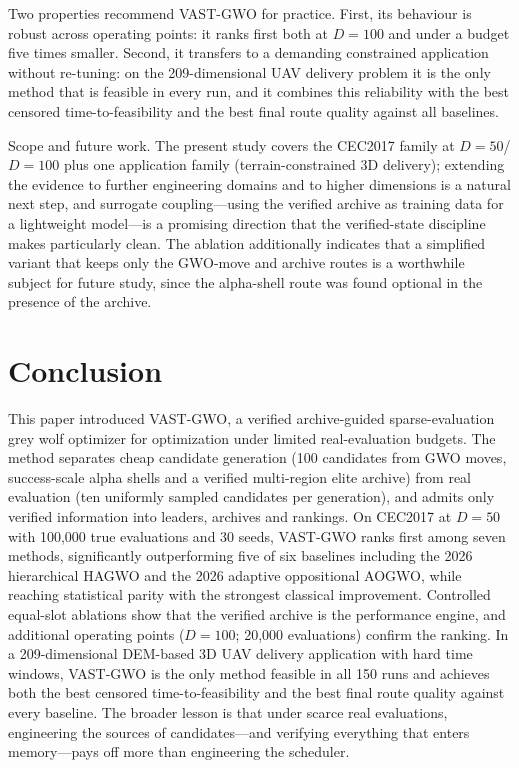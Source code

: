 \documentclass[journal]{IEEEtran}
\newcommand{\method}{VAST-GWO}
\begin{document}
Two properties recommend \method{} for practice. First, its behaviour is
robust across operating points: it ranks first both at $D=100$ and under a
budget five times smaller. Second, it transfers to a demanding constrained
application without re-tuning: on the 209-dimensional UAV delivery problem
it is the only method that is feasible in every run, and it combines this
reliability with the best censored time-to-feasibility and the best final
route quality against all baselines.

Scope and future work. The present study covers the CEC2017 family at
$D=50$/$D=100$ plus one application family (terrain-constrained 3D
delivery); extending the evidence to further engineering domains and to
higher dimensions is a natural next step, and surrogate coupling---using the
verified archive as training data for a lightweight model---is a promising
direction that the verified-state discipline makes particularly clean. The
ablation additionally indicates that a simplified variant that keeps only
the GWO-move and archive routes is a worthwhile subject for future study,
since the alpha-shell route was found optional in the presence of the
archive.

\section{Conclusion}
This paper introduced \method{}, a verified archive-guided sparse-evaluation
grey wolf optimizer for optimization under limited real-evaluation budgets.
The method separates cheap candidate generation (100 candidates from GWO
moves, success-scale alpha shells and a verified multi-region elite archive)
from real evaluation (ten uniformly sampled candidates per generation), and
admits only verified information into leaders, archives and rankings. On
CEC2017 at $D=50$ with 100{,}000 true evaluations and 30 seeds, \method{}
ranks first among seven methods, significantly outperforming five of six
baselines including the 2026 hierarchical HAGWO and the 2026 adaptive
oppositional AOGWO, while reaching statistical parity with the strongest
classical improvement. Controlled equal-slot ablations show that the verified
archive is the performance engine, and additional operating points
($D=100$; 20{,}000 evaluations) confirm the ranking. In a 209-dimensional
DEM-based 3D UAV delivery application with hard time windows, \method{} is
the only method feasible in all 150 runs and achieves both the best censored
time-to-feasibility and the best final route quality against every baseline.
The broader lesson is that under scarce real evaluations, engineering the
sources of candidates---and verifying everything that enters memory---pays
off more than engineering the scheduler.
\end{document}
